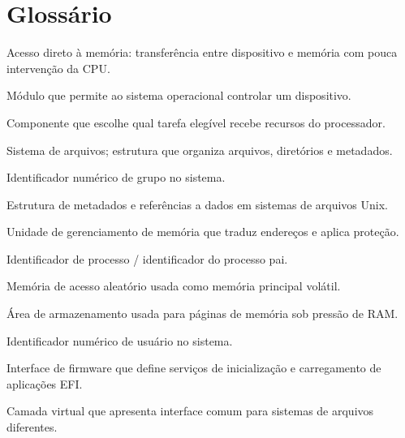 \documentclass[12pt,a4paper,oneside]{article}
\begin{document}
\section*{Glossário}
\begin{description}[leftmargin=3.3cm,style=nextline]
\item[DMA] Acesso direto à memória: transferência entre dispositivo e memória com pouca intervenção da CPU.
\item[Driver] Módulo que permite ao sistema operacional controlar um dispositivo.
\item[Escalonador] Componente que escolhe qual tarefa elegível recebe recursos do processador.
\item[Filesystem] Sistema de arquivos; estrutura que organiza arquivos, diretórios e metadados.
\item[GID] Identificador numérico de grupo no sistema.
\item[Inode] Estrutura de metadados e referências a dados em sistemas de arquivos Unix.
\item[MMU] Unidade de gerenciamento de memória que traduz endereços e aplica proteção.
\item[PID / PPID] Identificador de processo / identificador do processo pai.
\item[RAM] Memória de acesso aleatório usada como memória principal volátil.
\item[Swap] Área de armazenamento usada para páginas de memória sob pressão de RAM.
\item[UID] Identificador numérico de usuário no sistema.
\item[UEFI] Interface de firmware que define serviços de inicialização e carregamento de aplicações EFI.
\item[VFS] Camada virtual que apresenta interface comum para sistemas de arquivos diferentes.
\end{description}
\end{document}
